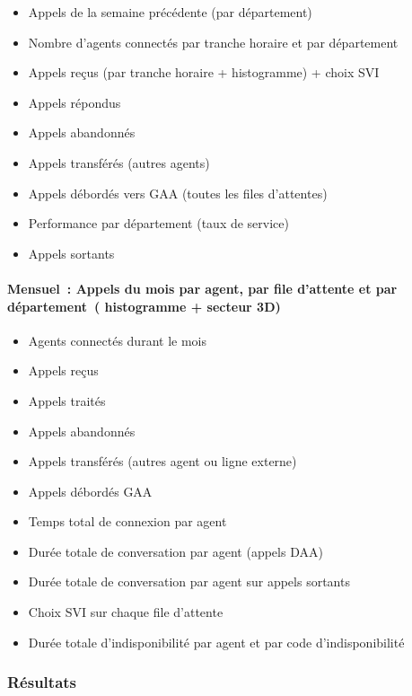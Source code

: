 \documentclass[a4paper,12pt]{report}
\begin{document}
\begin{itemize}
 \item Appels de la semaine précédente (par département)
               \item Nombre d’agents connectés par tranche horaire et par département
                 \item Appels reçus (par tranche horaire + histogramme) + choix SVI
                 \item Appels répondus 
                 \item Appels abandonnés
                 \item Appels transférés (autres agents)
                 \item Appels débordés vers GAA (toutes les files d’attentes)
                 \item Performance par département (taux de service) 
                 \item Appels sortants 
\end{itemize}
\paragraph{Mensuel :
    Appels du mois par agent, par file d’attente et par département ( histogramme + secteur 3D)\newline}
    
\begin{itemize}
 \item   Agents connectés durant le mois
     \item   Appels reçus 
      \item    Appels traités
         \item Appels abandonnés
         \item Appels transférés (autres agent ou ligne externe)
        \item Appels débordés GAA
        \item Temps total de connexion par agent
        \item Durée totale de conversation par agent (appels DAA)
        \item Durée totale de conversation par agent sur appels sortants
        \item Choix SVI sur chaque file d’attente
        \item Durée totale d’indisponibilité par agent et par code d’indisponibilité
\end{itemize}

\subsubsection{Résultats}
\end{document}
